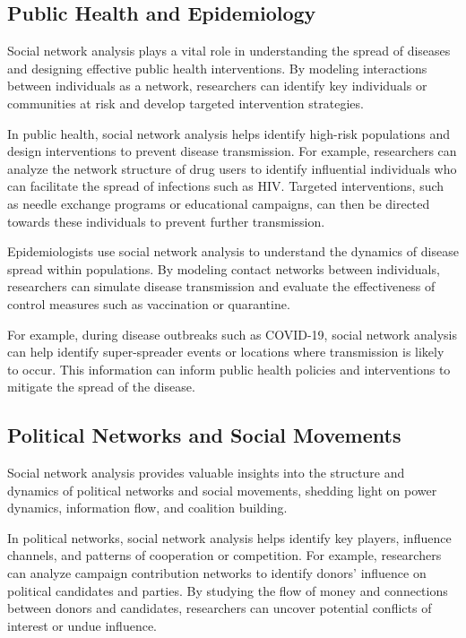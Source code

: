 \documentclass[12pt]{book} %
\begin{document}
\subsection{Public Health and Epidemiology}

Social network analysis plays a vital role in understanding the spread of diseases and designing effective public health interventions. By modeling interactions between individuals as a network, researchers can identify key individuals or communities at risk and develop targeted intervention strategies.

In public health, social network analysis helps identify high-risk populations and design interventions to prevent disease transmission. For example, researchers can analyze the network structure of drug users to identify influential individuals who can facilitate the spread of infections such as HIV. Targeted interventions, such as needle exchange programs or educational campaigns, can then be directed towards these individuals to prevent further transmission.

Epidemiologists use social network analysis to understand the dynamics of disease spread within populations. By modeling contact networks between individuals, researchers can simulate disease transmission and evaluate the effectiveness of control measures such as vaccination or quarantine.

For example, during disease outbreaks such as COVID-19, social network analysis can help identify super-spreader events or locations where transmission is likely to occur. This information can inform public health policies and interventions to mitigate the spread of the disease.

\subsection{Political Networks and Social Movements}

Social network analysis provides valuable insights into the structure and dynamics of political networks and social movements, shedding light on power dynamics, information flow, and coalition building.

In political networks, social network analysis helps identify key players, influence channels, and patterns of cooperation or competition. For example, researchers can analyze campaign contribution networks to identify donors' influence on political candidates and parties. By studying the flow of money and connections between donors and candidates, researchers can uncover potential conflicts of interest or undue influence.
\end{document}
